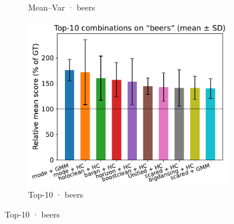 \documentclass[10pt]{article} %
\numberwithin{equation}{section}
\begin{document}
\begin{figure}[htbp]
\begin{subfigure}{0.32\linewidth}
    \caption{Mean–Var · beers}
  \end{subfigure}\hfill
  \begin{subfigure}{0.32\linewidth}
    \centering
    \includegraphics[width=\linewidth]{figures/5.3.1graph/top10_bar_error_beers.pdf}
    \caption{Top-10 · beers}
  \end{subfigure}


\end{figure}
\end{document}
